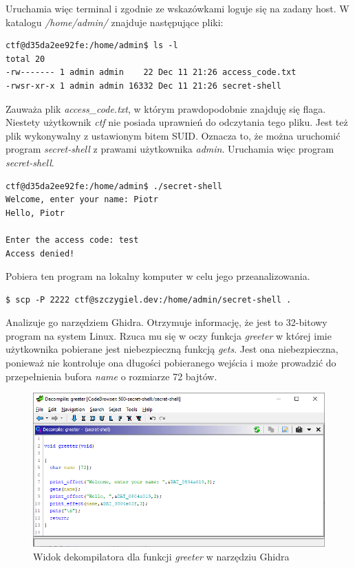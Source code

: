\documentclass[language=polish,type=eng]{aghmodern}
\begin{document}
\begin{appendices}
Uruchamia więc terminal i zgodnie ze wskazówkami loguje się na zadany host.
W katalogu \emph{/home/admin/} znajduje następujące pliki:

\begin{verbatim}
ctf@d35da2ee92fe:/home/admin$ ls -l
total 20
-rw------- 1 admin admin    22 Dec 11 21:26 access_code.txt
-rwsr-xr-x 1 admin admin 16332 Dec 11 21:26 secret-shell
\end{verbatim}

Zauważa plik \emph{access\_code.txt}, w którym prawdopodobnie znajduję się flaga.
Niestety użytkownik \emph{ctf} nie posiada uprawnień do odczytania tego pliku.
Jest też plik wykonywalny z ustawionym bitem SUID.
Oznacza to, że można uruchomić program \emph{secret-shell} z prawami użytkownika \emph{admin}.
Uruchamia więc program \emph{secret-shell}.

\begin{verbatim}
ctf@d35da2ee92fe:/home/admin$ ./secret-shell
Welcome, enter your name: Piotr
Hello, Piotr

Enter the access code: test
Access denied!
\end{verbatim}

Pobiera ten program na lokalny komputer w celu jego przeanalizowania.

\begin{verbatim}
$ scp -P 2222 ctf@szczygiel.dev:/home/admin/secret-shell .
\end{verbatim}

Analizuje go narzędziem Ghidra. Otrzymuje informację, że jest to 32-bitowy program
na system Linux. Rzuca mu się w oczy funkcja \emph{greeter} w której
imie użytkownika pobierane jest niebezpieczną funkcją \emph{gets}. Jest ona niebezpieczna,
ponieważ nie kontroluje ona długości pobieranego wejścia i może prowadzić do przepełnienia
bufora \emph{name} o rozmiarze 72 bajtów.

\begin{figure}[H]
\centering
\includegraphics[width=\textwidth]{500_greeter}
\caption{Widok dekompilatora dla funkcji \emph{greeter} w narzędziu Ghidra}
\end{figure}


\end{appendices}
\end{document}
